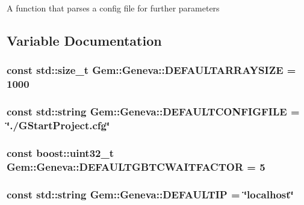 \label{db/de9/namespaceGem_1_1Geneva_a72bec142348625258508d6cb05700395}
A function that parses a config file for further parameters 

\subsection{Variable Documentation}
\hypertarget{namespaceGem_1_1Geneva_ad46712aab7136ab7e747ea8860ab46ff}{
\subsubsection[{DEFAULTARRAYSIZE}]{\setlength{\rightskip}{0pt plus 5cm}const std::size\_\-t {\bf Gem::Geneva::DEFAULTARRAYSIZE} = 1000}}
\label{db/de9/namespaceGem_1_1Geneva_ad46712aab7136ab7e747ea8860ab46ff}
\hypertarget{namespaceGem_1_1Geneva_aaba4e2cd93c01787464ebd89699a0259}{
\subsubsection[{DEFAULTCONFIGFILE}]{\setlength{\rightskip}{0pt plus 5cm}const std::string {\bf Gem::Geneva::DEFAULTCONFIGFILE} = \char`\"{}./GStartProject.cfg\char`\"{}}}
\label{db/de9/namespaceGem_1_1Geneva_aaba4e2cd93c01787464ebd89699a0259}
\hypertarget{namespaceGem_1_1Geneva_a1a77f7000b4cb6095f973fc2d0571ff9}{
\subsubsection[{DEFAULTGBTCWAITFACTOR}]{\setlength{\rightskip}{0pt plus 5cm}const boost::uint32\_\-t {\bf Gem::Geneva::DEFAULTGBTCWAITFACTOR} = 5}}
\label{db/de9/namespaceGem_1_1Geneva_a1a77f7000b4cb6095f973fc2d0571ff9}
\hypertarget{namespaceGem_1_1Geneva_a06037b35202b3efd9e20000d566bd790}{
\subsubsection[{DEFAULTIP}]{\setlength{\rightskip}{0pt plus 5cm}const std::string {\bf Gem::Geneva::DEFAULTIP} = \char`\"{}localhost\char`\"{}}}

